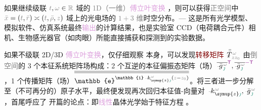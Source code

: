 如果继续级联 $\mathcolor{gray}{t}, \mathcolor{gray}{\omega} \in \mathcolor{gray}{\mathbb{R}}$ 域的 \textcolor{gray}{1D（一维）}\textcolor{Plum}{傅立叶变换} ，则可以获得\textcolor{gray}{正空间}中 $\mathcolor{gray}{\bar{x}} = \left( \mathcolor{gray}{t}, \mathcolor{gray}{\bar{r}} \right) \asymp \left( \mathcolor{gray}{t}, \mathcolor{gray}{\bar{\rho}}, \mathcolor{gray}{z} \right)$ 域上的光电场的 \textcolor{gray}{$1+3$ 维}时空分布。--- 这是所有光学模型、模拟软件、仿真系统最终\textcolor{Plum}{输出}的计算结果，也是实验室 CCD（电荷耦合元件）相机、生物感光器官（如肉眼）所能直接捕获和探测到的实验数据。

如果不级联 2D/3D \textcolor{Plum}{傅立叶变换}，仅仔细观察  本身，可以发现\textcolor{Maroon}{转移矩阵} $\xint{\mathcolor{gray}{-}}{30}{\bar{\bar{T}}}^{\;\!\mathcolor{gray}{\omega}}_{\;\! \mathcolor{gray}{z} \mathcolor{gray}{z_0}}$ 由\textcolor{gray}{倒空间}的 3 个\textcolor{PineGreen}{本征系统}矩阵场构成：2 个互逆的\textcolor{PineGreen}{本征偏振态矩阵}（场）$\overline{\xint{{}^{}_{\mathcolor{gray}{-}}}{10}{\bar{g}}^{\;\!\mathcolor{gray}{\omega}}_{\;\! \textcolor{PineGreen}{\jmath}}}^{\mathsf{\textcolor{Plum}{T}}}, \overline{\xint{{}^{}_{\mathcolor{gray}{-}}}{10}{\bar{g}}^{\;\!\mathcolor{gray}{\omega}}_{\;\! \textcolor{PineGreen}{\jmath}}}^{\textcolor{Plum}{-\mathsf{T}}}$，1 个\textcolor{PineGreen}{传播矩阵}（场）$\overline{\overline{\mathbb{e}^{\mathbb{i} \xint{\begin{smallmatrix} ~ \\ {}^{}_{\mathcolor{gray}{-}} \\ ~ \end{smallmatrix}}{15}{k}_{\symup{z} \textcolor{PineGreen}{\jmath}}^{\;\! \mathcolor{gray}{\omega}} \left( \mathcolor{gray}{z} - \mathcolor{gray}{z_0} \right)}}}$。将三者进一步分解至（不可再分的）原子水平，最终便发现再次回归\textcolor{PineGreen}{本征值}-\textcolor{PineGreen}{向量}对 $\xint{\begin{smallmatrix} ~ \\ {}^{}_{\mathcolor{gray}{-}} \\ ~ \end{smallmatrix}}{15}{k}_{\symup{z} \textcolor{PineGreen}{\jmath}}^{\;\! \mathcolor{gray}{\omega}}, \xint{{}^{}_{\mathcolor{gray}{-}}}{10}{\bar{g}}^{\;\!\mathcolor{gray}{\omega}}_{\;\! \textcolor{PineGreen}{\jmath}}$，首尾呼应了  开篇的论点：即\textcolor{Plum}{线性}\textcolor{PineGreen}{晶体光学}始于\textcolor{PineGreen}{特征方程} 。

